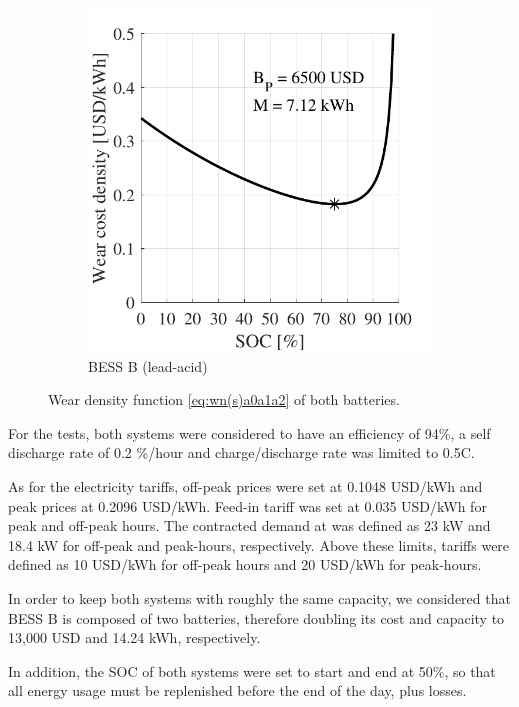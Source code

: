 \documentclass{ieeeaccess}
\begin{document}
\begin{figure}[!h]
\begin{subfigure}{.235\textwidth}
            \includegraphics[width=\linewidth]{figures/marginal_Rolls_8CH33P_lead-acid.pdf}
            \caption{\ac{BESS} B (lead-acid)}
            \label{fig:wn_curves1B}
        \end{subfigure}
        \caption{Wear density function \eqref{eq:wn(s)a0a1a2} of both batteries.}
        \label{fig:wn_curves1}
    \end{figure}

    For the tests, both systems were considered to have an efficiency of 94\%, a self discharge rate of 0.2 \%/hour and charge/discharge rate was limited to 0.5C.

    As for the electricity tariffs, off-peak prices were set at 0.1048 USD/kWh and peak prices at 0.2096 USD/kWh. Feed-in tariff was set at 0.035 USD/kWh for peak and off-peak hours. The contracted demand at was defined as 23 kW and 18.4 kW for off-peak and peak-hours, respectively. Above these limits, tariffs were defined as 10 USD/kWh for off-peak hours and 20 USD/kWh for peak-hours.

    In order to keep both systems with roughly the same capacity, we considered that \ac{BESS} B is composed of two batteries, therefore doubling its cost and capacity to 13,000 USD and 14.24 kWh, respectively.

    In addition, the \ac{SOC} of both systems were set to start and end at 50\%, so that all energy usage must be replenished before the end of the day, plus losses.
\end{document}
